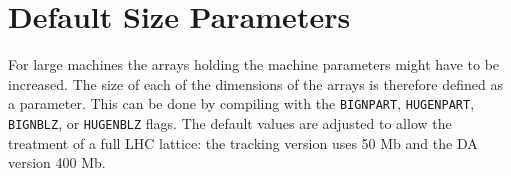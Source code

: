 \newpage

\section{Default Size Parameters} \label{DSP}

For large machines the arrays holding the machine parameters might have to be increased.
The size of each of the dimensions of the arrays is therefore defined as a parameter.
This can be done by compiling with the \texttt{BIGNPART}, \texttt{HUGENPART}, \texttt{BIGNBLZ}, or \texttt{HUGENBLZ} flags.
The default values are adjusted to allow the treatment of a full LHC lattice: the tracking version uses 50 Mb and the DA version 400 Mb.

 \setcounter{dsp}{0}

